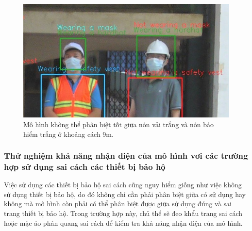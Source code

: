 \begin{figure}[ht!]
	\centerline{\includegraphics[scale=0.8]{images/bad_hh_9m_zoom.jpg}}
  	\caption{Mô hình không thể phân biệt tốt giữa nón vải trắng và nón bảo hiểm trắng ở khoảng cách 9m.}
  	\label{fig:good_hh_9m_zoom}
\end{figure}

\subsubsection{Thử nghiệm khả năng nhận diện của mô hình vơi các trường hợp sử dụng sai cách các thiết bị bảo hộ}
Việc sử dụng các thiết bị bảo hộ sai cách cũng nguy hiểm giống như việc không sử dụng thiết bị bảo hộ, do đó không chỉ cần phải phân biệt giữa có sử dụng hay không mà mô hình còn phải có thể phân biệt được giữa sử dụng đúng và sai trang thiết bị bảo hộ. Trong trường hợp này, chủ thể sẽ đeo khẩu trang sai cách hoặc mặc áo phản quang sai cách để kiểm tra khả năng nhận diện của mô hình.

